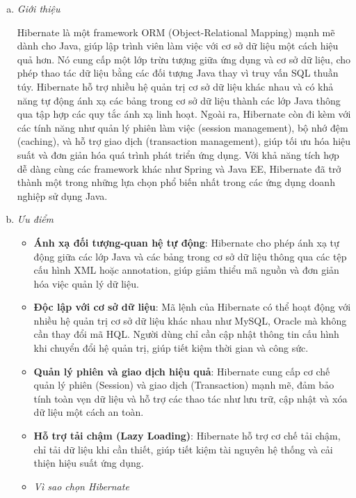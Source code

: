     \begin{enumerate}[(a)]
        \item \textit{Giới thiệu}
        
            Hibernate là một framework ORM (Object-Relational Mapping) mạnh mẽ dành cho Java, giúp lập trình viên làm việc với cơ sở dữ liệu một cách hiệu quả hơn. Nó cung cấp một lớp trừu tượng giữa ứng dụng và cơ sở dữ liệu, cho phép thao tác dữ liệu bằng các đối tượng Java thay vì truy vấn SQL thuần túy. Hibernate hỗ trợ nhiều hệ quản trị cơ sở dữ liệu khác nhau và có khả năng tự động ánh xạ các bảng trong cơ sở dữ liệu thành các lớp Java thông qua tập hợp các quy tắc ánh xạ linh hoạt. Ngoài ra, Hibernate còn đi kèm với các tính năng như quản lý phiên làm việc (session management), bộ nhớ đệm (caching), và hỗ trợ giao dịch (transaction management), giúp tối ưu hóa hiệu suất và đơn giản hóa quá trình phát triển ứng dụng. Với khả năng tích hợp dễ dàng cùng các framework khác như Spring và Java EE, Hibernate đã trở thành một trong những lựa chọn phổ biến nhất trong các ứng dụng doanh nghiệp sử dụng Java.
            
        \item \textit{Ưu điểm}

        \begin{itemize}
            \item \textbf{Ánh xạ đối tượng-quan hệ tự động}: Hibernate cho phép ánh xạ tự động giữa các lớp Java và các bảng trong cơ sở dữ liệu thông qua các tệp cấu hình XML hoặc annotation, giúp giảm thiểu mã nguồn và đơn giản hóa việc quản lý dữ liệu.
            \item \textbf{Độc lập với cơ sở dữ liệu}: Mã lệnh của Hibernate có thể hoạt động với nhiều hệ quản trị cơ sở dữ liệu khác nhau như MySQL, Oracle mà không cần thay đổi mã HQL. Người dùng chỉ cần cập nhật thông tin cấu hình khi chuyển đổi hệ quản trị, giúp tiết kiệm thời gian và công sức.
            \item \textbf{Quản lý phiên và giao dịch hiệu quả}: Hibernate cung cấp cơ chế quản lý phiên (Session) và giao dịch (Transaction) mạnh mẽ, đảm bảo tính toàn vẹn dữ liệu và hỗ trợ các thao tác như lưu trữ, cập nhật và xóa dữ liệu một cách an toàn.
            \item \textbf{Hỗ trợ tải chậm (Lazy Loading)}: Hibernate hỗ trợ cơ chế tải chậm, chỉ tải dữ liệu khi cần thiết, giúp tiết kiệm tài nguyên hệ thống và cải thiện hiệu suất ứng dụng.

        \item \textit{Vì sao chọn Hibernate}


\end{itemize}
\end{enumerate}

